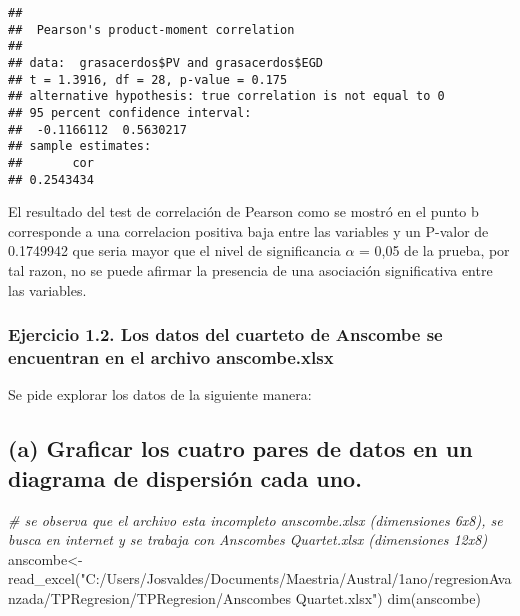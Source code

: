 \documentclass[
]{article}
\newenvironment{Shaded}{\begin{snugshade}}{\end{snugshade}}
\newcommand{\CommentTok}[1]{\textcolor[rgb]{0.56,0.35,0.01}{\textit{#1}}}
\newcommand{\FunctionTok}[1]{\textcolor[rgb]{0.00,0.00,0.00}{#1}}
\newcommand{\NormalTok}[1]{#1}
\newcommand{\OtherTok}[1]{\textcolor[rgb]{0.56,0.35,0.01}{#1}}
\newcommand{\StringTok}[1]{\textcolor[rgb]{0.31,0.60,0.02}{#1}}
\begin{document}
\begin{verbatim}
## 
##  Pearson's product-moment correlation
## 
## data:  grasacerdos$PV and grasacerdos$EGD
## t = 1.3916, df = 28, p-value = 0.175
## alternative hypothesis: true correlation is not equal to 0
## 95 percent confidence interval:
##  -0.1166112  0.5630217
## sample estimates:
##       cor 
## 0.2543434
\end{verbatim}

El resultado del test de correlación de Pearson como se mostró en el
punto b corresponde a una correlacion positiva baja entre las variables
y un P-valor de 0.1749942 que seria mayor que el nivel de significancia
\(\alpha\) = 0,05 de la prueba, por tal razon, no se puede afirmar la
presencia de una asociación significativa entre las variables.

\hypertarget{ejercicio-1.2.-los-datos-del-cuarteto-de-anscombe-se-encuentran-en-el-archivo-anscombe.xlsx}{%
\subsubsection{Ejercicio 1.2. Los datos del cuarteto de Anscombe se
encuentran en el archivo
anscombe.xlsx}\label{ejercicio-1.2.-los-datos-del-cuarteto-de-anscombe-se-encuentran-en-el-archivo-anscombe.xlsx}}

Se pide explorar los datos de la siguiente manera:

\hypertarget{a-graficar-los-cuatro-pares-de-datos-en-un-diagrama-de-dispersiuxf3n-cada-uno.}{%
\subsection{(a) Graficar los cuatro pares de datos en un diagrama de
dispersión cada
uno.}\label{a-graficar-los-cuatro-pares-de-datos-en-un-diagrama-de-dispersiuxf3n-cada-uno.}}

\begin{Shaded}
\begin{Highlighting}[]
\CommentTok{\# se observa que el archivo esta incompleto anscombe.xlsx (dimensiones 6x8), se busca en internet y se trabaja con Anscombe\textquotesingle{}s Quartet.xlsx (dimensiones 12x8)}
\NormalTok{anscombe}\OtherTok{\textless{}{-}}\FunctionTok{read\_excel}\NormalTok{(}\StringTok{"C:/Users/Josvaldes/Documents/Maestria/Austral/1ano/regresionAvanzada/TPRegresion/TPRegresion/Anscombe\textquotesingle{}s Quartet.xlsx"}\NormalTok{)}
\FunctionTok{dim}\NormalTok{(anscombe)}
\end{Highlighting}
\end{Shaded}
\end{document}
